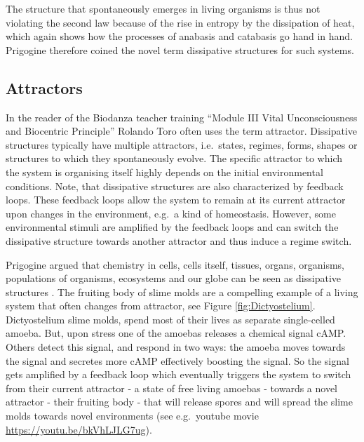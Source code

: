 \documentclass[
  11pt,
]{book}
\begin{document}
The structure that spontaneously emerges in living organisms is thus not violating the second law because of the rise in entropy by the dissipation of heat, which again shows how the processes of anabasis and catabasis go hand in hand.
Prigogine therefore coined the novel term dissipative structures for such systems.

\hypertarget{attractors}{%
\subsection{Attractors}\label{attractors}}

In the reader of the Biodanza teacher training ``Module III Vital Unconsciousness and Biocentric Principle'' Rolando Toro often uses the term attractor. Dissipative structures typically have multiple attractors, i.e.~states, regimes, forms, shapes or structures to which they spontaneously evolve. The specific attractor to which the system is organising itself highly depends on the initial environmental conditions.
Note, that dissipative structures are also characterized by feedback loops.
These feedback loops allow the system to remain at its current attractor upon changes in the environment, e.g.~a kind of homeostasis.
However, some environmental stimuli are amplified by the feedback loops and can switch the dissipative structure towards another attractor and thus induce a regime switch.

Prigogine argued that chemistry in cells, cells itself, tissues, organs, organisms, populations of organisms, ecosystems and our globe can be seen as dissipative structures \citep{prigogineStengers1984}.
The fruiting body of slime molds are a compelling example of a living system that often changes from attractor, see Figure \ref{fig:Dictyostelium}. Dictyostelium slime molds, spend most of their lives as separate single-celled amoeba. But, upon stress one of the amoebas releases a chemical signal cAMP. Others detect this signal, and respond in two ways: the amoeba moves towards the signal and secretes more cAMP effectively boosting the signal. So the signal gets amplified by a feedback loop which eventually triggers the system to switch from their current attractor - a state of free living amoebas - towards a novel attractor - their fruiting body - that will release spores and will spread the slime molds towards novel environments (see e.g.~youtube movie \url{https://youtu.be/bkVhLJLG7ug}).

\pagebreak
\end{document}
